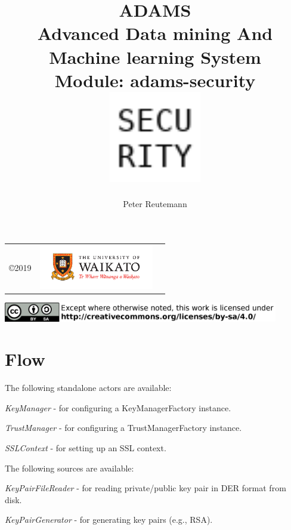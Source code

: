 \documentclass[a4paper]{book}
\title{
  \textbf{ADAMS} \\
  {\Large \textbf{A}dvanced \textbf{D}ata mining \textbf{A}nd \textbf{M}achine
  learning \textbf{S}ystem} \\
  {\Large Module: adams-security} \\
  \vspace{1cm}
  \includegraphics[width=4cm]{images/security-module.png} \\
}
\author{
  Peter Reutemann
}
\begin{document}
\begin{titlepage}
\maketitle

\thispagestyle{empty}
\center
\begin{table}[b]
	\begin{tabular}{c l l}
		\parbox[c][2cm]{2cm}{\copyright 2019} &
		\parbox[c][2cm]{5cm}{\includegraphics[width=5cm]{images/coat_of_arms.pdf}} \\
	\end{tabular}
	\includegraphics[width=12cm]{images/cc.png} \\
\end{table}

\end{titlepage}

\tableofcontents

\chapter{Flow}
\noindent The following standalone actors are available:
\begin{tight_itemize}
  \item \textit{KeyManager} - for configuring a KeyManagerFactory instance.
  \item \textit{TrustManager} - for configuring a TrustManagerFactory instance.
  \item \textit{SSLContext} - for setting up an SSL context.
\end{tight_itemize}

\noindent The following sources are available:
\begin{tight_itemize}
  \item \textit{KeyPairFileReader} - for reading private/public key pair in
  DER format from disk.
  \item \textit{KeyPairGenerator} - for generating key pairs (e.g., RSA).
\end{tight_itemize}
\end{document}

